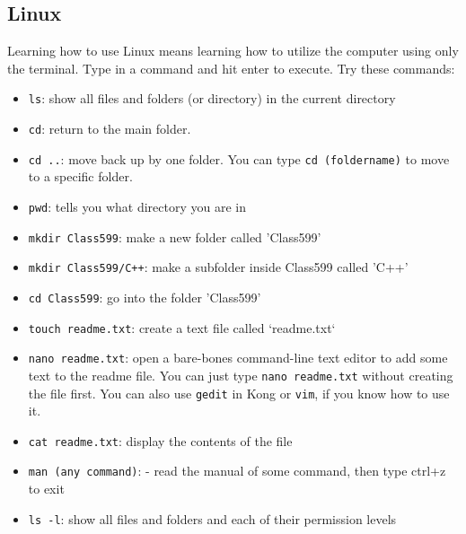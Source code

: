 \documentclass{article}
\begin{document}
\subsection{Linux}
Learning how to use Linux means learning how to utilize the computer using only the terminal. Type in a command and hit enter to execute. Try these commands:
\begin{itemize}
    \item \texttt{ls}: show all files and folders (or directory) in the current directory
    \item \texttt{cd}: return to the main folder.
    \item \texttt{cd ..}: move back up by one folder. You can type \texttt{cd (foldername)} to move to a specific folder.
    \item \texttt{pwd}: tells you what directory you are in
    \item \texttt{mkdir Class599}: make a new folder called 'Class599'
    \item \texttt{mkdir Class599/C++}: make a subfolder inside Class599 called 'C++'
    \item \texttt{cd Class599}: go into the folder 'Class599'
    \item \texttt{touch readme.txt}: create a text file called `readme.txt`
    \item \texttt{nano readme.txt}: open a bare-bones command-line text editor to add some text to the readme file. You can just type \texttt{nano readme.txt} without creating the file first. You can also use \texttt{gedit} in Kong or \texttt{vim}, if you know how to use it.
    \item \texttt{cat readme.txt}: display the contents of the file
    \item \texttt{man (any command)}: - read the manual of some command, then type ctrl+z to exit
    \item \texttt{ls -l}: show all files and folders and each of their permission levels
\end{itemize}
\end{document}
